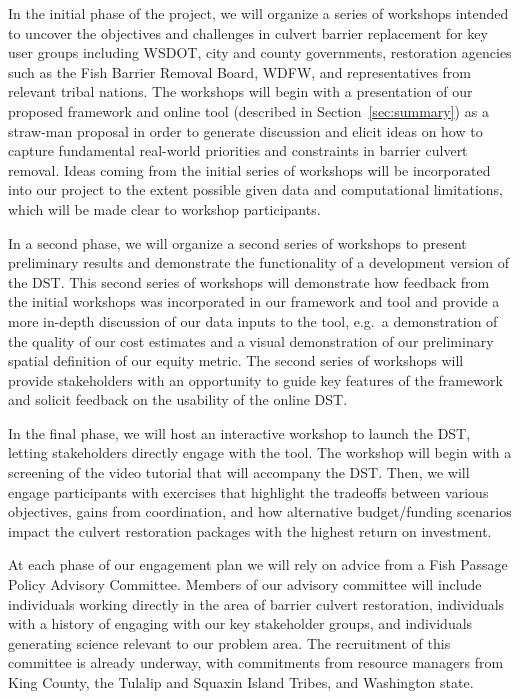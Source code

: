 \documentclass[12pt]{elsarticle}
\begin{document}
	In the initial phase of the project, we will organize a series of workshops intended to uncover the objectives and challenges in culvert barrier replacement for key user groups including WSDOT, city and county governments, restoration agencies such as the Fish Barrier Removal Board, WDFW, and representatives from relevant tribal nations. The workshops will begin with a presentation of our proposed framework and online tool (described in Section~\ref{sec:summary}) as a straw-man proposal in order to generate discussion and elicit ideas on how to capture fundamental real-world priorities and constraints in barrier culvert removal. Ideas coming from the initial series of workshops will be incorporated into our project to the extent possible given data and computational limitations, which will be made clear to workshop participants.
	
	In a second phase, we will organize a second series of workshops to present preliminary results and demonstrate the functionality of a development version of the DST. This second series of workshops will demonstrate how feedback from the initial workshops was incorporated in our framework and tool and provide a more in-depth discussion of our data inputs to the tool, e.g.\ a demonstration of the quality of our cost estimates and a visual demonstration of our preliminary spatial definition of our equity metric. The second series of workshops will provide stakeholders with an opportunity to guide key features of the framework and solicit feedback on the usability of the online DST.
	
	In the final phase, we will host an interactive workshop to launch the DST, letting stakeholders directly engage with the tool. The workshop will begin with a screening of the video tutorial that will accompany the DST. Then, we will engage participants with exercises that highlight the tradeoffs between various objectives, gains from coordination, and how alternative budget/funding scenarios impact the culvert restoration packages with the highest return on investment. 
	
	At each phase of our engagement plan we will rely on advice from a Fish Passage Policy Advisory Committee. Members of our advisory committee will include individuals working directly in the area of barrier culvert restoration, individuals with a history of engaging with our key stakeholder groups, and individuals generating science relevant to our problem area. The recruitment of this committee is already underway, with commitments from resource managers from King County, the Tulalip and Squaxin Island Tribes, and Washington state. 
	
\end{document}
